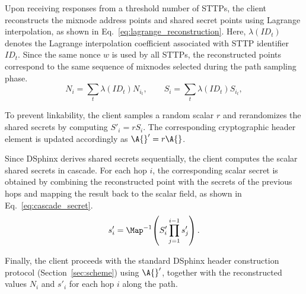 Upon receiving responses from a threshold number of STTPs, the client reconstructs the mixnode address points and shared secret points using Lagrange interpolation, as shown in Eq.~\ref{eq:lagrange_reconstruction}. 
Here, $\lambda(ID_t)$ denotes the Lagrange interpolation coefficient associated with STTP identifier $ID_t$. 
Since the same nonce $w$ is used by all STTPs, the reconstructed points correspond to the same sequence of mixnodes selected during the path sampling phase.
\begin{equation}
    N_i = \sum_t \lambda(ID_t) N_{i_t}, \qquad
    S_i = \sum_t \lambda(ID_t) S_{i_t},
    \label{eq:lagrange_reconstruction}
\end{equation}

To prevent linkability, the client samples a random scalar $r$ and rerandomizes the shared secrets by computing $S'_i = r S_i$. 
The corresponding cryptographic header element is updated accordingly as $\A{}' = r\A{}$.

Since DSphinx derives shared secrets sequentially, the client computes the scalar shared secrets in cascade. 
For each hop $i$, the corresponding scalar secret is obtained by combining the reconstructed point with the secrets of the previous hops and mapping the result back to the scalar field, as shown in Eq.~\ref{eq:cascade_secret}. 
\begin{equation}
    s'_i = \Map^{-1}\!\left(S'_i \prod_{j=1}^{i-1} s'_j \right).
    \label{eq:cascade_secret}
\end{equation}

Finally, the client proceeds with the standard DSphinx header construction protocol (Section~\ref{sec:scheme}) using $\A{}'$, together with the reconstructed values $N_i$ and $s'_i$ for each hop $i$ along the path.
